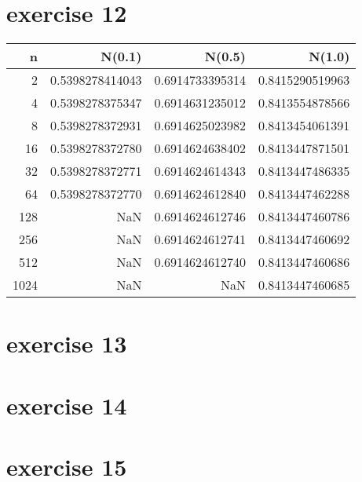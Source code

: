 \documentclass{article}
\begin{document}
\section{exercise 12}
\begin{tabular}{rrrr}
    \toprule
    n    & N(0.1)          & N(0.5)          & N(1.0)          \\
    \midrule
    2    & 0.5398278414043 & 0.6914733395314 & 0.8415290519963 \\
    4    & 0.5398278375347 & 0.6914631235012 & 0.8413554878566 \\
    8    & 0.5398278372931 & 0.6914625023982 & 0.8413454061391 \\
    16   & 0.5398278372780 & 0.6914624638402 & 0.8413447871501 \\
    32   & 0.5398278372771 & 0.6914624614343 & 0.8413447486335 \\
    64   & 0.5398278372770 & 0.6914624612840 & 0.8413447462288 \\
    128  & NaN             & 0.6914624612746 & 0.8413447460786 \\
    256  & NaN             & 0.6914624612741 & 0.8413447460692 \\
    512  & NaN             & 0.6914624612740 & 0.8413447460686 \\
    1024 & NaN             & NaN             & 0.8413447460685 \\
    \bottomrule
\end{tabular}

\section{exercise 13}
\section{exercise 14}
\section{exercise 15}
\end{document}
